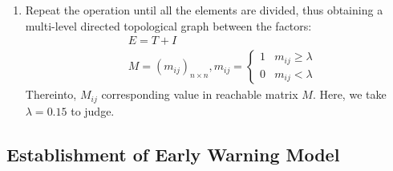 \documentclass[12pt]{article}  %
\begin{document}
\begin{enumerate}
\item Repeat the operation until all the elements are divided, thus obtaining a multi-level directed topological graph between the factors:
\begin{eqnarray}
	&E=T+I\\
	&M=(m_{ij})_{n\times n},m_{ij}=\left\{\begin{matrix}
 1 &m_{ij}\ge \lambda \\
 0 &m_{ij}<\lambda
\end{matrix}\right.
\end{eqnarray}
Thereinto, $M_{ij}$ corresponding value in reachable matrix $M$. Here, we take $\lambda=0.15$ to judge.
\end{enumerate}
\subsection{Establishment of Early Warning Model}
\label{ewm}
\end{document}

